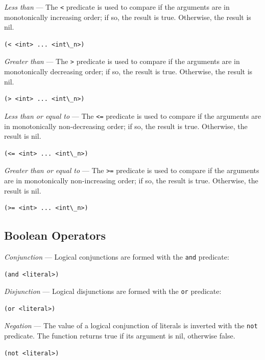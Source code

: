 \documentclass[
a4paper, %
11pt, %
onecolumn, %
openany, %
]{memoir}
\begin{document}
{\textit{Less than} --- The \texttt{<} predicate is used to compare if the arguments are in monotonically increasing order; if so, the result is true. Otherwise, the result is nil.

\begin{lstlisting}
(< <int> ... <int\_n>)
\end{lstlisting}

\textit{Greater than} --- The \texttt{>} predicate is used to compare if the arguments are in monotonically decreasing order; if so, the result is true. Otherwise, the result is nil.

\begin{lstlisting}
(> <int> ... <int\_n>)
\end{lstlisting}

\textit{Less than or equal to} --- The \texttt{<=} predicate is used to compare if the arguments are in monotonically non-decreasing order; if so, the result is true. Otherwise, the result is nil.

\begin{lstlisting}
(<= <int> ... <int\_n>)
\end{lstlisting}


\textit{Greater than or equal to} --- The \texttt{>=} predicate is used to compare if the arguments are in monotonically non-increasing order; if so, the result is true. Otherwise, the result is nil.

\begin{lstlisting}
(>= <int> ... <int\_n>)
\end{lstlisting}

\subsection{Boolean Operators}

\textit{Conjunction} --- Logical conjunctions are formed with the \texttt{and} predicate: 

\begin{lstlisting}
(and <literal>)
\end{lstlisting}

\textit{Disjunction} --- Logical disjunctions are formed with the \texttt{or} predicate:

\begin{lstlisting}
(or <literal>)
\end{lstlisting}

\textit{Negation} --- The value of a logical conjunction of literals is inverted with the \texttt{not} predicate. The function returns true if its argument is nil, otherwise false.

\begin{lstlisting}
(not <literal>)
\end{lstlisting}
}
\end{document}
